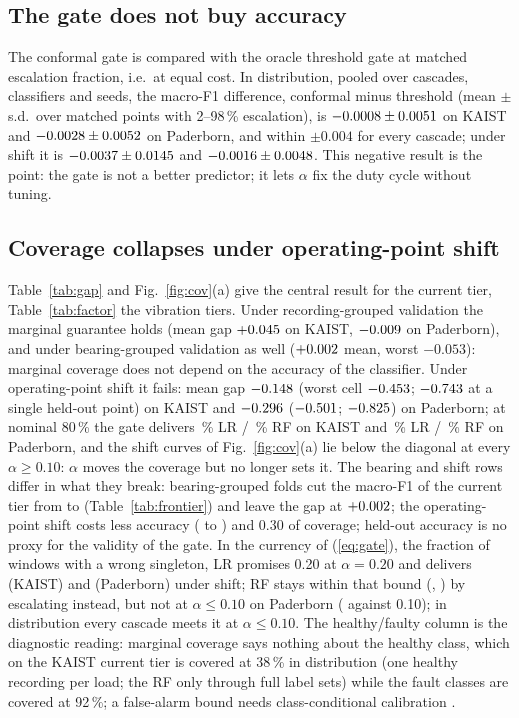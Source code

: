 \documentclass{ifacconf}
\begin{document}
\subsection{The gate does not buy accuracy}\label{sec:gate}
The conformal gate is compared with the oracle threshold gate at matched escalation fraction, i.e.\ at equal cost. In distribution, pooled over cascades, classifiers and seeds, the macro-F1 difference, conformal minus threshold (mean $\pm$ s.d.\ over matched points with 2--98\,\% escalation), is $-0.0008 \pm 0.0051$ on KAIST and $-0.0028 \pm 0.0052$ on Paderborn, and within $\pm0.004$ for every cascade; under shift it is $-0.0037 \pm 0.0145$ and $-0.0016 \pm 0.0048$. This negative result is the point: the gate is not a better predictor; it lets $\alpha$ fix the duty cycle without tuning.

\subsection{Coverage collapses under operating-point shift}\label{sec:collapse}
Table~\ref{tab:gap} and Fig.~\ref{fig:cov}(a) give the central result for the current tier, Table~\ref{tab:factor} the vibration tiers. Under recording-grouped validation the marginal guarantee holds (mean gap $+0.045$ on KAIST, $-0.009$ on Paderborn), and under bearing-grouped validation as well ($+0.002$ mean, worst $-0.053$): marginal coverage does not depend on the accuracy of the classifier. Under operating-point shift it fails: mean gap $-0.148$ (worst cell $-0.453$; $-0.743$ at a single held-out point) on KAIST and $-0.296$ ($-0.501$; $-0.825$) on Paderborn; at nominal 80\,\% the gate delivers \covEightyKlr\,\% LR / \covEightyKrf\,\% RF on KAIST and \covEightyPlr\,\% LR / \covEightyPrf\,\% RF on Paderborn, and the shift curves of Fig.~\ref{fig:cov}(a) lie below the diagonal at every $\alpha\ge0.10$: $\alpha$ moves the coverage but no longer sets it. The bearing and shift rows differ in what they break: bearing-grouped folds cut the macro-F1 of the current tier from \fCurGrpP{} to \fCurBearP{} (Table~\ref{tab:frontier}) and leave the gap at $+0.002$; the operating-point shift costs less accuracy (\fCurGrpP{} to \fCurShiftP) and 0.30 of coverage; held-out accuracy is no proxy for the validity of the gate. In the currency of (\ref{eq:gate}), the fraction of windows with a wrong singleton, LR promises 0.20 at $\alpha=0.20$ and delivers \wrongLrK{} (KAIST) and \wrongLrP{} (Paderborn) under shift; RF stays within that bound (\wrongRfK, \wrongRfP) by escalating instead, but not at $\alpha\le0.10$ on Paderborn (\wrongCurRfPten{} against 0.10); in distribution every cascade meets it at $\alpha\le0.10$. The healthy/faulty column is the diagnostic reading: marginal coverage says nothing about the healthy class, which on the KAIST current tier is covered at 38\,\% in distribution (one healthy recording per load; the RF only through full label sets) while the fault classes are covered at 92\,\%; a false-alarm bound needs class-conditional calibration \citep{heddoub2026classconditional}.
\end{document}
